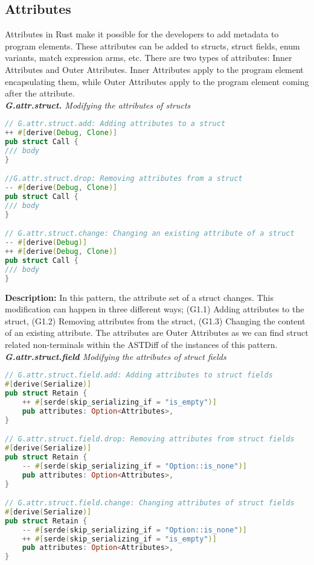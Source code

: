 \subsection{Attributes}

Attributes in Rust make it possible for the developers to add metadata to program elements. These attributes can be added to structs, struct fields, enum variants, match expression arms, etc. There are two types of attributes: Inner Attributes and Outer Attributes. Inner Attributes apply to the program element encapsulating them, while Outer Attributes apply to the program element coming after the attribute. \\

\noindent \textit{ \textbf{G.attr.struct.} Modifying the attributes of structs}

\begin{lstlisting}[language=Rust, style=colouredRust, label={l3}]
// G.attr.struct.add: Adding attributes to a struct
++ #[derive(Debug, Clone)]
pub struct Call {
/// body 
}

//G.attr.struct.drop: Removing attributes from a struct
-- #[derive(Debug, Clone)]
pub struct Call {
/// body 
}

// G.attr.struct.change: Changing an existing attribute of a struct
-- #[derive(Debug)]
++ #[derive(Debug, Clone)]
pub struct Call {
/// body 
}
\end{lstlisting}

\noindent \textbf{Description:} In this pattern, the attribute set of a struct changes. This modification can happen in three different ways; (G1.1) Adding attributes to the struct, (G1.2) Removing attributes from the struct, (G1.3) Changing the content of an existing attribute. The attributes are Outer Attributes as we can find struct related non-terminals within the ASTDiff of the instances of this pattern. \\

\noindent \textit{ \textbf{G.attr.struct.field} Modifying the attributes of struct fields}

\begin{lstlisting}[language=Rust, style=colouredRust, label={l3}]
// G.attr.struct.field.add: Adding attributes to struct fields
#[derive(Serialize)]
pub struct Retain {
    ++ #[serde(skip_serializing_if = "is_empty")]
    pub attributes: Option<Attributes>,
}

// G.attr.struct.field.drop: Removing attributes from struct fields
#[derive(Serialize)]
pub struct Retain {
    -- #[serde(skip_serializing_if = "Option::is_none")]
    pub attributes: Option<Attributes>,
}

// G.attr.struct.field.change: Changing attributes of struct fields
#[derive(Serialize)]
pub struct Retain {
    -- #[serde(skip_serializing_if = "Option::is_none")]
    ++ #[serde(skip_serializing_if = "is_empty")]
    pub attributes: Option<Attributes>,
}
\end{lstlisting}

